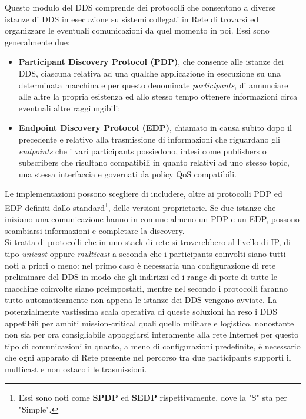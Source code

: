 \indent Questo modulo del DDS comprende dei protocolli che consentono a diverse istanze di DDS in esecuzione su sistemi collegati in Rete di trovarsi ed organizzare le eventuali comunicazioni da quel momento in poi. Essi sono generalmente due:
\begin{itemize}
    \item \textbf{Participant Discovery Protocol (PDP)}, che consente alle istanze dei DDS, ciascuna relativa ad una qualche applicazione in esecuzione su una determinata macchina e per questo denominate \emph{participants}, di annunciare alle altre la propria esistenza ed allo stesso tempo ottenere informazioni circa eventuali altre raggiungibili;
    \item \textbf{Endpoint Discovery Protocol (EDP)}, chiamato in causa subito dopo il precedente e relativo alla trasmissione di informazioni che riguardano gli \emph{endpoints} che i vari participants possiedono, intesi come publishers o subscribers che risultano compatibili in quanto relativi ad uno stesso topic, una stessa interfaccia e governati da policy QoS compatibili.
\end{itemize}
Le implementazioni possono scegliere di includere, oltre ai protocolli PDP ed EDP definiti dallo standard\footnote{Essi sono noti come \textbf{SPDP} ed \textbf{SEDP} rispettivamente, dove la "S" sta per "Simple".}, delle versioni proprietarie. Se due istanze che iniziano una comunicazione hanno in comune almeno un PDP e un EDP, possono scambiarsi informazioni e completare la discovery.\\
Si tratta di protocolli che in uno stack di rete si troverebbero al livello di IP, di tipo \emph{unicast} oppure \emph{multicast} a seconda che i participants coinvolti siano tutti noti a priori o meno: nel primo caso è necessaria una configurazione di rete preliminare del DDS in modo che gli indirizzi ed i range di porte di tutte le macchine coinvolte siano preimpostati, mentre nel secondo i protocolli faranno tutto automaticamente non appena le istanze dei DDS vengono avviate. La potenzialmente vastissima scala operativa di queste soluzioni ha reso i DDS appetibili per ambiti mission-critical quali quello militare e logistico, nonostante non sia per ora consigliabile appoggiarsi interamente alla rete Internet per questo tipo di comunicazioni in quanto, a meno di configurazioni predefinite, è necessario che ogni apparato di Rete presente nel percorso tra due participants supporti il multicast e non ostacoli le trasmissioni.

